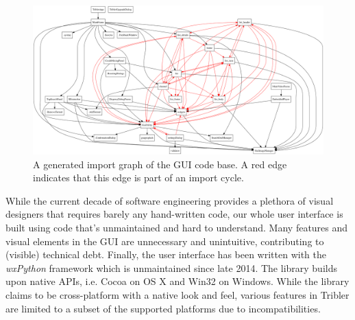 \begin{figure}[!h]
	\centering
	\includegraphics[width=1.0\columnwidth]{images/problem_description/wx_cycles}
	\caption{A generated import graph of the GUI code base. A red edge indicates that this edge is part of an import cycle.}
	\label{fig:wx-import-graph}
\end{figure}

While the current decade of software engineering provides a plethora of visual designers that requires barely any hand-written code, our whole user interface is built using code that's unmaintained and hard to understand. Many features and visual elements in the GUI are unnecessary and unintuitive, contributing to (visible) technical debt. Finally, the user interface has been written with the \emph{wxPython} framework which is unmaintained since late 2014. The library builds upon native APIs, i.e. Cocoa on OS X and Win32 on Windows. While the library claims to be cross-platform with a native look and feel, various features in Tribler are limited to a subset of the supported platforms due to incompatibilities.

